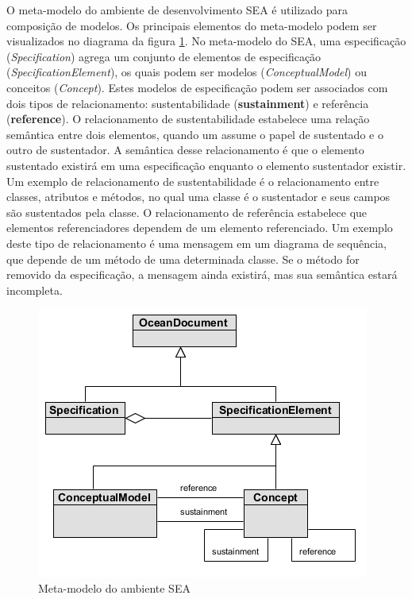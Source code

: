 O meta-modelo do ambiente de desenvolvimento SEA \cite{silva:00} é utilizado para composição de modelos. Os principais elementos do meta-modelo podem ser
visualizados no diagrama da figura \ref{fig:sea_meta_model}. No meta-modelo do SEA, uma especificação (\textit{Specification}) agrega um conjunto de elementos de
especificação (\textit{SpecificationElement}), os quais podem ser modelos (\textit{ConceptualModel}) ou conceitos (\textit{Concept}). Estes modelos
de especificação podem ser associados com dois tipos de relacionamento: sustentabilidade (\textbf{sustainment}) e referência (\textbf{reference}). O
relacionamento de sustentabilidade estabelece uma relação semântica entre dois elementos, quando um assume o papel de sustentado e o outro de
sustentador. A semântica desse relacionamento é que o elemento sustentado existirá em uma especificação enquanto o elemento sustentador existir.
Um exemplo de relacionamento de sustentabilidade é o relacionamento entre classes, atributos e métodos, no qual uma classe é o sustentador e seus
campos são sustentados pela classe. O relacionamento de referência estabelece que elementos referenciadores dependem de um elemento referenciado. Um
exemplo deste tipo de relacionamento é uma mensagem em um diagrama de sequência, que depende de um método de uma determinada classe. Se o método for
removido da especificação, a mensagem ainda existirá, mas sua semântica estará incompleta.

  \begin{figure}[!h]
	\centering
	\includegraphics{img/sea_meta_model.png}
	\caption{Meta-modelo do ambiente SEA \cite{silva:00}}\label{fig:sea_meta_model}
  \end{figure}

